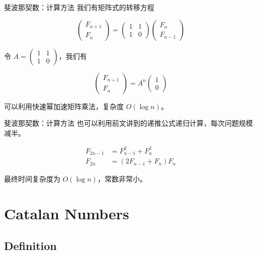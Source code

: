 \documentclass[12pt,aspectratio=169,handout]{beamer}
\begin{document}
\begin{frame}[fragile]{斐波那契数：计算方法}
我们有矩阵式的转移方程

$$
\begin{pmatrix}
  F_{n+1} \\
  F_{n}
\end{pmatrix}
=
\begin{pmatrix}
  1 & 1 \\
  1 & 0
\end{pmatrix}
\begin{pmatrix}
  F_{n} \\
  F_{n-1}
\end{pmatrix}
$$

令 $A = \begin{pmatrix}1 & 1 \\ 1 & 0\end{pmatrix}$，我们有

$$
\begin{pmatrix}
  F_{n+1} \\
  F_{n}
\end{pmatrix}
= A^n
\begin{pmatrix}
  1 \\
  0
\end{pmatrix}
$$

可以利用快速幂加速矩阵乘法，复杂度 $O(\log n)$。
\end{frame}

\begin{frame}[fragile]{斐波那契数：计算方法}
  也可以利用前文讲到的递推公式递归计算，每次问题规模减半。
  
  $$
  \begin{aligned}
    F_{2n-1} &= F_{n-1}^2 + F_{n}^2 \\
    F_{2n} &= (2 F_{n-1}+  F_{n}) F_{n}
  \end{aligned}
  $$

  最终时间复杂度为 $O(\log n)$，常数非常小。
\end{frame}

\section[卡特兰数]{Catalan Numbers}

\subsection[卡特兰数]{Definition}
\end{document}

